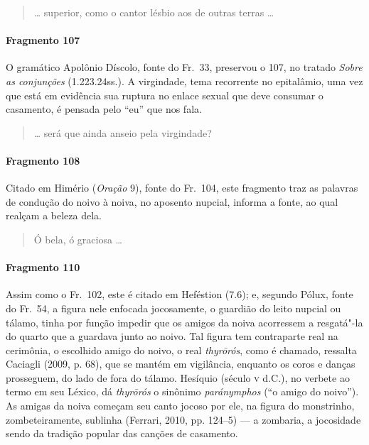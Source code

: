 {\begin{verse}
\ldots{} superior, como o cantor lésbio aos de outras \qb{}terras \ldots{}
\end{verse}

\paragraph{Fragmento 107}

{\small O gramático Apolônio Díscolo, fonte do Fr.~33, preservou o 107, no tratado
\textit{Sobre as conjunções} (1.223.24ss.). A virgindade, tema recorrente no epitalâmio, uma
vez que está em evidência sua ruptura no enlace sexual que deve consumar o
casamento, é pensada pelo “eu” que nos fala.}

\begin{verse}
\ldots{} será que ainda anseio pela virgindade?
\end{verse}

\paragraph{Fragmento 108}

{\small Citado em Himério (\textit{Oração} 9), fonte do Fr.~104, este fragmento traz as palavras de condução do noivo à noiva, no aposento nupcial, informa a fonte, ao qual realçam a beleza dela.}

\begin{verse}
Ó bela, ó graciosa \ldots{}
\end{verse}

\paragraph{Fragmento 110}

{\small Assim como o Fr.~102, este é citado em Heféstion (7.6); e, segundo Pólux, fonte do Fr.~54, a figura nele enfocada jocosamente, o guardião do leito nupcial ou tálamo,
tinha por função impedir que os amigos da noiva acorressem a resgatá"-la do
quarto que a guardava junto ao noivo.
Tal figura tem contraparte real na cerimônia, o escolhido amigo do noivo, o real \textit{thyrōrós}, como é chamado, ressalta Caciagli (2009, p. 68), que se mantém em vigilância, enquanto os coros e danças prosseguem, do lado de fora do tálamo. Hesíquio (século \textsc{v} d.C.), no verbete ao termo em seu Léxico, dá \textit{thyrōrós} o sinônimo \textit{paránymphos} (``o amigo do noivo''). As amigas da noiva começam seu canto jocoso por ele, na figura do monstrinho, zombeteiramente, sublinha (Ferrari, 2010, pp. 124--5) --- a zombaria, a jocosidade sendo da tradição popular das canções de casamento.}

}
